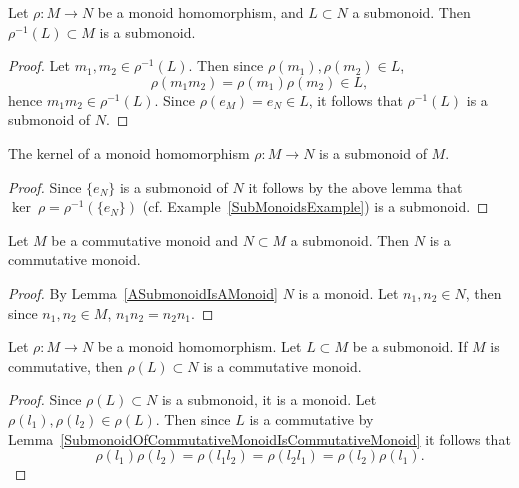\begin{lemma}\label{MonoidHomomorphismPreImageOfSubmonoidIsSubmonoid}
    Let $\rho: M\rightarrow N$ be a monoid homomorphism, and $L\subset N$ a submonoid. Then $\rho^{-1}(L)\subset M$ is a submonoid. 
\end{lemma}
\begin{proof}
    Let $m_1,m_2\in \rho^{-1}(L)$. Then since $\rho(m_1),\rho(m_2)\in L$,
    $$\rho(m_1m_2)=\rho(m_1)\rho(m_2)\in L,$$
    hence $m_1m_2\in \rho^{-1}(L)$. Since $\rho(e_M)=e_N \in L$, it follows that $\rho^{-1}(L)$ is a submonoid of $N$.
\end{proof}
\begin{corollary}\label{MonoidHomomorphismKernelIsSubmonoid}
    The kernel of a monoid homomorphism $\rho: M\rightarrow N$ is a submonoid of $M$.
\end{corollary}
\begin{proof}
    Since $\{e_N\}$ is a submonoid of $N$ it follows by the above lemma that $\ker\ \rho = \rho^{-1}(\{e_N\})$ (cf. Example~\ref{SubMonoidsExample}) is a submonoid.
\end{proof}
\begin{lemma}\label{SubmonoidOfCommutativeMonoidIsCommutativeMonoid}
    Let $M$ be a commutative monoid and $N\subset M$ a submonoid. Then $N$ is a commutative monoid.
\end{lemma}
\begin{proof}
    By Lemma~\ref{ASubmonoidIsAMonoid} $N$ is a monoid. Let $n_1,n_2\in N$, then since $n_1,n_2\in M$, $n_1n_2= n_2n_1$. 
\end{proof}
\begin{lemma}
    Let $\rho : M \rightarrow N$ be a monoid homomorphism. Let $L\subset M$ be a submonoid. If $M$ is commutative, then $\rho(L)\subset N$ is a commutative monoid. 
\end{lemma}
\begin{proof}
    Since $\rho(L)\subset N$ is a submonoid, it is a monoid. Let $\rho(l_1),\rho(l_2)\in \rho(L)$. Then since $L$ is a commutative by Lemma~\ref{SubmonoidOfCommutativeMonoidIsCommutativeMonoid} it follows that  
    $$\rho(l_1)\rho(l_2) = \rho(l_1l_2) = \rho(l_2l_1) = \rho(l_2)\rho(l_1).$$
\end{proof}
